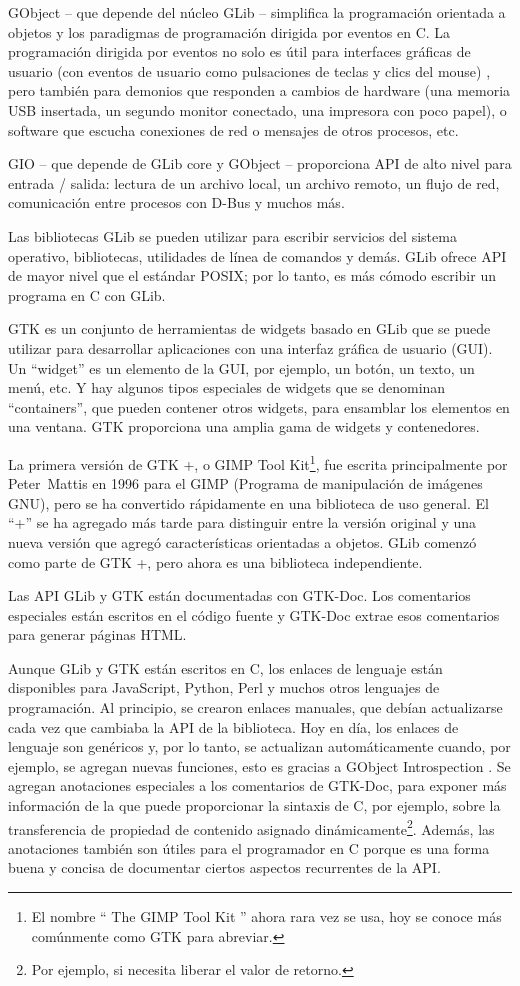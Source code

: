 GObject -- que depende del núcleo GLib -- simplifica la programación orientada a objetos y los paradigmas de programación dirigida por eventos en C. La programación dirigida por eventos no solo es útil para interfaces gráficas de usuario (con eventos de usuario como pulsaciones de teclas y clics del mouse) , pero también para demonios que responden a cambios de hardware (una memoria USB insertada, un segundo monitor conectado, una impresora con poco papel), o software que escucha conexiones de red o mensajes de otros procesos, etc.

GIO -- que depende de GLib core y GObject -- proporciona API de alto nivel para entrada / salida: lectura de un archivo local, un archivo remoto, un flujo de red, comunicación entre procesos con D-Bus y muchos más.

Las bibliotecas GLib se pueden utilizar para escribir servicios del sistema operativo, bibliotecas, utilidades de línea de comandos y demás. GLib ofrece API de mayor nivel que el estándar POSIX; por lo tanto, es más cómodo escribir un programa en C con GLib.

GTK es un conjunto de herramientas de widgets basado en GLib que se puede utilizar para desarrollar aplicaciones con una interfaz gráfica de usuario (GUI). Un ``widget'' es un elemento de la GUI, por ejemplo, un botón, un texto, un menú, etc. Y hay algunos tipos especiales de widgets que se denominan ``containers'', que pueden contener otros widgets, para ensamblar los elementos en una ventana. GTK proporciona una amplia gama de widgets y contenedores.

La primera versión de GTK +, o GIMP Tool Kit\footnote{El nombre `` The GIMP Tool Kit '' ahora rara vez se usa, hoy se conoce más comúnmente como GTK para abreviar.}, fue escrita principalmente por Peter~Mattis en 1996 para el GIMP (Programa de manipulación de imágenes GNU), pero se ha convertido rápidamente en una biblioteca de uso general. El ``+'' se ha agregado más tarde para distinguir entre la versión original y una nueva versión que agregó características orientadas a objetos. GLib comenzó como parte de GTK +, pero ahora es una biblioteca independiente.

Las API GLib y GTK están documentadas con GTK-Doc. Los comentarios especiales están escritos en el código fuente y GTK-Doc extrae esos comentarios para generar páginas HTML.

Aunque GLib y GTK están escritos en C, los enlaces de lenguaje están disponibles para JavaScript, Python, Perl y muchos otros lenguajes de programación. Al principio, se crearon enlaces manuales, que debían actualizarse cada vez que cambiaba la API de la biblioteca. Hoy en día, los enlaces de lenguaje son genéricos y, por lo tanto, se actualizan automáticamente cuando, por ejemplo, se agregan nuevas funciones, esto es gracias a GObject Introspection . Se agregan anotaciones especiales a los comentarios de GTK-Doc, para exponer más información de la que puede proporcionar la sintaxis de C, por ejemplo, sobre la transferencia de propiedad de contenido asignado dinámicamente\footnote{Por ejemplo, si necesita liberar el valor de retorno.}. Además, las anotaciones también son útiles para el programador en C porque es una forma buena y concisa de documentar ciertos aspectos recurrentes de la API.

